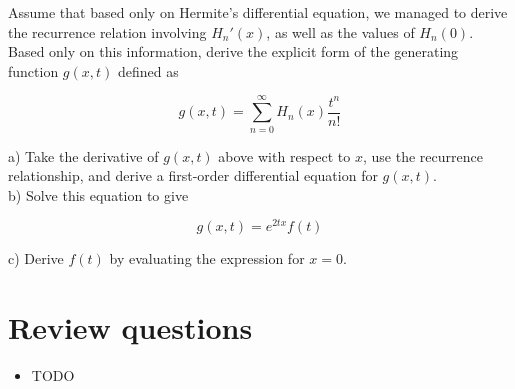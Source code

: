 \begin{exer}
Assume that based only on Hermite's differential equation, we managed to derive the recurrence relation involving $H_n'(x)$, as well as the values of $H_n(0)$. Based only on this information, derive the explicit form of the generating function $g(x,t)$ defined as

$$g(x,t) = \sum_{n = 0}^{\infty} H_n(x)\frac{t^n}{n!} $$

a) Take the derivative of $g(x,t)$ above with respect to $x$, use the recurrence relationship, and derive a first-order differential equation for $g(x,t)$.\\

b) Solve this equation to give

$$g(x,t) = e^{2tx} f(t)$$

c) Derive $f(t)$ by evaluating the expression for $x=0$.
\end{exer}


\section*{Review questions}

\begin{itemize}
\item TODO
\end{itemize}


